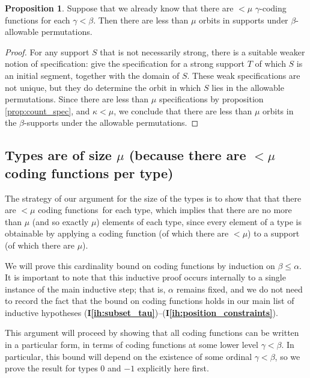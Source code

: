 \documentclass{article}
\theoremstyle{definition}
\newtheorem{proposition}[theorem]{Proposition}
\theoremstyle{remark}
\newcommand{\ihref}[1]{(\textbf{I\ref{#1}})}
\begin{document}
\begin{proposition}\label{prop:count_support_orbits}
  Suppose that we already know that there are $<\mu$ $\gamma$-coding functions for each $\gamma<\beta$.
  Then there are less than $\mu$ orbits in supports under $\beta$-allowable permutations.
\end{proposition}
\begin{proof}
For any support $S$ that is not necessarily strong, there is a suitable weaker notion of specification: give the specification for a strong support $T$ of which $S$ is an initial segment, together with the domain of $S$.
These weak specifications are not unique, but they do determine the orbit in which $S$ lies in the allowable permutations.
Since there are less than $\mu$ specifications by proposition \ref{prop:count_spec}, and $\kappa < \mu$, we conclude that there are less than $\mu$ orbits in the $\beta$-supports under the allowable permutations.
\end{proof}

\subsection{Types are of size $\mu$ (because there are $<\mu$ coding functions per type)}

The strategy of our argument for the size of the types is to show that that there are $<\mu$ coding functions\ for each type, which implies that there are no more than $\mu$ (and so exactly $\mu$) elements of each type, since every element of a type is obtainable by applying a coding function (of which there are $<\mu$) to a support (of which there are $\mu$).


We will prove this cardinality bound on coding functions by induction on $\beta \leq \alpha$.
It is important to note that this inductive proof occurs internally to a single instance of the main inductive step; that is, $\alpha$ remains fixed, and we do not need to record the fact that the bound on coding functions holds in our main list of inductive hypotheses \ihref{ih:subset_tau}--\ihref{ih:position_constraints}.


This argument will proceed by showing that all coding functions can be written in a particular form, in terms of coding functions at some lower level $\gamma < \beta$.
In particular, this bound will depend on the existence of some ordinal $\gamma < \beta$, so we prove the result for types 0 and $-1$ explicitly here first.
\end{document}
